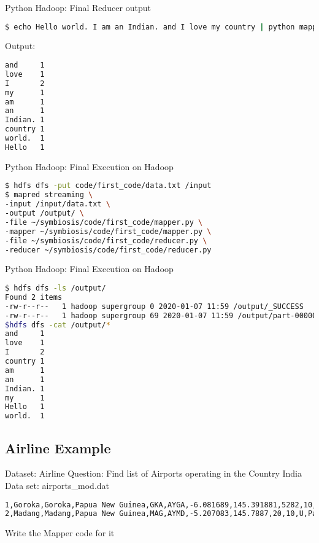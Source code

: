 \documentclass[pdf]{beamer}
\begin{document}
\begin{frame}[fragile]{Python Hadoop: Final Reducer output}
\begin{lstlisting}[language=bash]
$ echo Hello world. I am an Indian. and I love my country | python mapper.py | python reducer.py
\end{lstlisting}
Output:
\begin{lstlisting}[language=bash]
and     1
love    1
I       2
my      1
am      1
an      1
Indian. 1
country 1
world.  1
Hello   1
\end{lstlisting}
\end{frame}


\begin{frame}[fragile]{Python Hadoop: Final Execution on Hadoop}
\begin{lstlisting}[language=bash]
$ hdfs dfs -put code/first_code/data.txt /input
$ mapred streaming \
-input /input/data.txt \ 
-output /output/ \
-file ~/symbiosis/code/first_code/mapper.py \
-mapper ~/symbiosis/code/first_code/mapper.py \
-file ~/symbiosis/code/first_code/reducer.py \
-reducer ~/symbiosis/code/first_code/reducer.py 
\end{lstlisting}
\end{frame}

\begin{frame}[fragile]{Python Hadoop: Final Execution on Hadoop}
\begin{lstlisting}[language=bash]
$ hdfs dfs -ls /output/
Found 2 items
-rw-r--r--   1 hadoop supergroup 0 2020-01-07 11:59 /output/_SUCCESS
-rw-r--r--   1 hadoop supergroup 69 2020-01-07 11:59 /output/part-00000
$hdfs dfs -cat /output/*
and     1
love    1
I       2
country 1
am      1
an      1
Indian. 1
my      1
Hello   1
world.  1
\end{lstlisting}
\end{frame}


\subsection{Airline Example}
\begin{frame}[fragile]{Dataset: Airline}
Question: Find list of Airports operating in the Country India
\\
Data set: airports\_mod.dat

\begin{lstlisting}[language=bash]
1,Goroka,Goroka,Papua New Guinea,GKA,AYGA,-6.081689,145.391881,5282,10,U,Pacific/Port_Moresby
2,Madang,Madang,Papua New Guinea,MAG,AYMD,-5.207083,145.7887,20,10,U,Pacific/Port_Moresby
\end{lstlisting}
Write the Mapper code for it
\end{frame}
\end{document}

